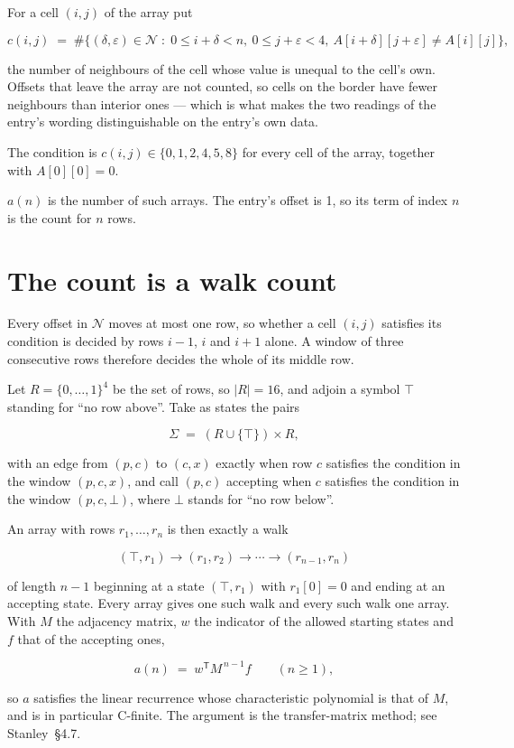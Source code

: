 \documentclass[11pt]{article}
\theoremstyle{definition}
\begin{document}
For a cell $(i,j)$ of the array put

\[c(i,j) \;=\; \#\bigl\{(\delta,\varepsilon)\in\mathcal{N} \;:\; 0\le i+\delta<n,\ 0\le j+\varepsilon<4,\ A[i+\delta][j+\varepsilon] \neq A[i][j]\bigr\},\]

the number of neighbours of the cell whose value is unequal to the cell's own. Offsets that leave the array are not counted, so cells on the border have fewer neighbours than interior ones --- which is what makes the two readings of the entry's wording distinguishable on the entry's own data.

The condition is $c(i,j) \in \{0, 1, 2, 4, 5, 8\}$ for every cell of the array, together with $A[0][0]=0$.

$a(n)$ is the number of such arrays. The entry's offset is 1, so its term of index $n$ is the count for $n$ rows.

\section{The count is a walk count}

Every offset in $\mathcal{N}$ moves at most one row, so whether a cell $(i,j)$ satisfies its condition is decided by rows $i-1$, $i$ and $i+1$ alone. A window of three consecutive rows therefore decides the whole of its middle row.

Let $R = \{0,\dots,1\}^{4}$ be the set of rows, so $|R| = 16$, and adjoin a symbol $\top$ standing for ``no row above''. Take as states the pairs

\[\Sigma \;=\; (R \cup \{\top\}) \times R,\]

with an edge from $(p,c)$ to $(c,x)$ exactly when row $c$ satisfies the condition in the window $(p,c,x)$, and call $(p,c)$ accepting when $c$ satisfies the condition in the window $(p,c,\bot)$, where $\bot$ stands for ``no row below''.

An array with rows $r_1,\dots,r_n$ is then exactly a walk

\[(\top,r_1) \to (r_1,r_2) \to \cdots \to (r_{n-1},r_n)\]

of length $n-1$ beginning at a state $(\top,r_1)$ with $r_1[0]=0$ and ending at an accepting state. Every array gives one such walk and every such walk one array. With $M$ the adjacency matrix, $w$ the indicator of the allowed starting states and $f$ that of the accepting ones,

\[a(n) \;=\; w^{\mathsf T} M^{\,n-1} f \qquad (n \ge 1),\]

so $a$ satisfies the linear recurrence whose characteristic polynomial is that of $M$, and is in particular C-finite. The argument is the transfer-matrix method; see Stanley~\S4.7.
\end{document}
